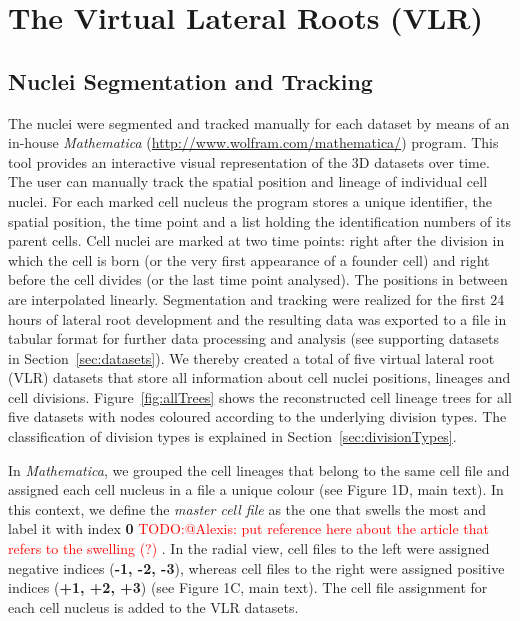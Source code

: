 \documentclass[11pt,a4paper, final]{article}
\newcommand{\TODO}[1]{
\textcolor{red}{TODO:#1}
}
\begin{document}
\clearpage
\section{The Virtual Lateral Roots (VLR)}
\subsection{Nuclei Segmentation and Tracking}
\label{sec:segmentation}
\noindent
The nuclei were segmented and tracked manually for each dataset by means of an in-house \textit{Mathematica} (\href{http://www.wolfram.com/mathematica/}{http://www.wolfram.com/mathematica/}) program. This tool provides an interactive visual representation of the 3D datasets over time. The user can manually track the spatial position and lineage of individual cell nuclei. For each marked cell nucleus the program stores a unique identifier, the spatial position, the time point and a list holding the identification numbers of its parent cells. Cell nuclei are marked at two time points: right after the division in which the cell is born (or the very first appearance of a founder cell) and right before the cell divides (or the last time point analysed). The positions in between are interpolated linearly. Segmentation and tracking were realized for the first 24 hours of lateral root development and the resulting data was exported to a file in tabular format for further data processing and analysis (see supporting datasets in Section~\ref{sec:datasets}). We thereby created a total of five virtual lateral root (VLR) datasets that store all information about cell nuclei positions, lineages and cell divisions. Figure~\ref{fig:allTrees} shows the reconstructed cell lineage trees for all five datasets with nodes coloured according to the underlying division types. The classification of division types is explained in Section~\ref{sec:divisionTypes}.

In \textit{Mathematica}, we grouped the cell lineages that belong to the same cell file and assigned each cell nucleus in a file a unique colour (see Figure 1D, main text). In this context, we define the \textit{master cell file} as the one that swells the most and label it with index \textbf{0} \TODO{@Alexis: put reference here about the article that refers to the swelling (?)}. In the radial view, cell files to the left were assigned negative indices (\textbf{-1, -2, -3}), whereas cell files to the right were assigned positive indices (\textbf{+1, +2, +3}) (see Figure 1C, main text). The cell file assignment for each cell nucleus is added to the VLR datasets.
\end{document}
